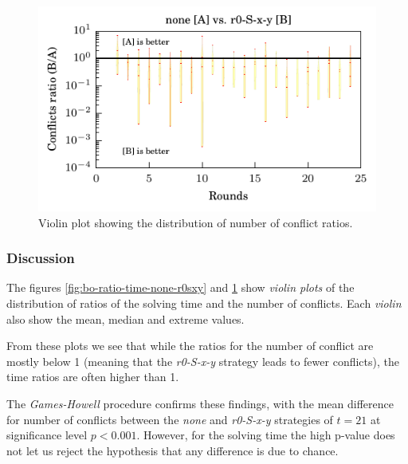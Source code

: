 \begin{figure}
\centering \includegraphics{figures/bo-ex1/ratio-confl-none-r0sxy.pdf}
\caption{Violin plot showing the distribution of number of conflict ratios.}
\label{fig:bo-ratio-confl-none-r0sxy}
\end{figure}

\subsubsection{Discussion}


The figures \ref{fig:bo-ratio-time-none-r0sxy} and \ref{fig:bo-ratio-confl-none-r0sxy} show \emph{violin plots} of the distribution of ratios of the solving time and the number of conflicts.
Each \emph{violin} also show the mean, median and extreme values.

From these plots we see that while the ratios for the number of conflict are mostly below 1 (meaning that the \emph{r0-S-x-y} strategy leads to fewer conflicts), the time ratios are often higher than 1.

The \emph{Games-Howell} procedure confirms these findings, with the mean difference for number of conflicts between the \emph{none} and \emph{r0-S-x-y} strategies of $t = 21$ at significance level $p < 0.001$.
However, for the solving time the high p-value does not let us reject the hypothesis that any difference is due to chance.

